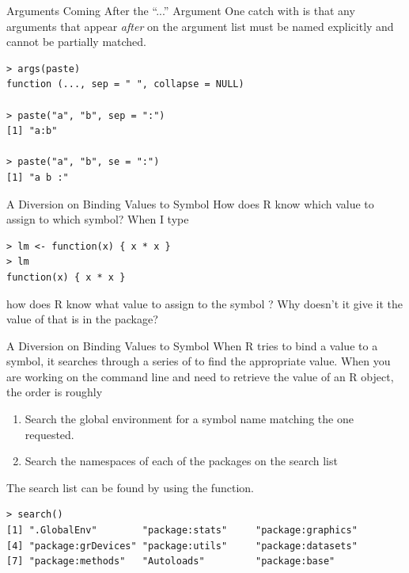 \documentclass[aspectratio=169]{beamer}
\begin{document}
\begin{frame}[fragile]{Arguments Coming After the ``...'' Argument}
One catch with  is that any arguments that appear
\textit{after}  on the argument list must be named
explicitly and cannot be partially matched.
\begin{verbatim}
> args(paste)
function (..., sep = " ", collapse = NULL) 

> paste("a", "b", sep = ":")
[1] "a:b"

> paste("a", "b", se = ":")
[1] "a b :"
\end{verbatim}
\end{frame}


\begin{frame}[fragile]{A Diversion on Binding Values to Symbol}
How does R know which value to assign to which symbol?  When I type
\begin{verbatim}
> lm <- function(x) { x * x }
> lm
function(x) { x * x }
\end{verbatim}
how does R know what value to assign to the symbol ?  Why
doesn't it give it the value of  that is in the 
package?
\end{frame}

\begin{frame}[fragile]{A Diversion on Binding Values to Symbol}
When R tries to bind a value to a symbol, it searches through a series
of  to find the appropriate value.  When you are
working on the command line and need to retrieve the value of an R
object, the order is roughly
\begin{enumerate}
\item
Search the global environment for a symbol name matching the one
requested.
\item
Search the namespaces of each of the packages on the search list
\end{enumerate}
The search list can be found by using the  function.
\begin{verbatim}
> search()
[1] ".GlobalEnv"        "package:stats"     "package:graphics" 
[4] "package:grDevices" "package:utils"     "package:datasets" 
[7] "package:methods"   "Autoloads"         "package:base"     
\end{verbatim}
\end{frame}
\end{document}
